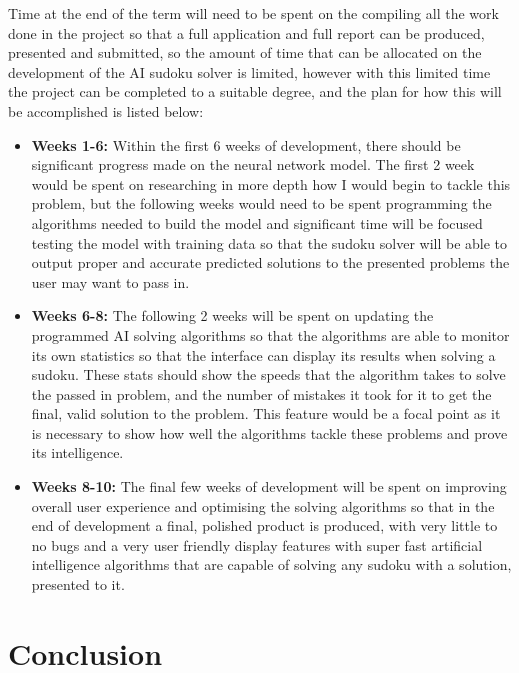\documentclass[]{final_report}
\begin{document}
Time at the end of the term will need to be spent on the compiling all the work done in the project so that a full application and full report can be produced, presented and submitted, so the amount of time that can be allocated on the development of the AI sudoku solver is limited, however with this limited time the project can be completed to a suitable degree, and the plan for how this will be accomplished is listed below:

\begin{itemize} 
    \item \textbf{Weeks 1-6:} Within the first 6 weeks of development, there should be significant progress made on the neural network model. The first 2 week would be spent on researching in more depth how I would begin to tackle this problem, but the following weeks would need to be spent programming the algorithms needed to build the model and significant time will be focused testing the model with training data so that the sudoku solver will be able to output proper and accurate predicted solutions to the presented problems the user may want to pass in.

    \item \textbf{Weeks 6-8:} The following 2 weeks will be spent on updating the programmed AI solving algorithms so that the algorithms are able to monitor its own statistics so that the interface can display its results when solving a sudoku. These stats should show the speeds that the algorithm takes to solve the passed in problem, and the number of mistakes it took for it to get the final, valid solution to the problem. This feature would be a focal point as it is necessary to show how well the algorithms tackle these problems and prove its intelligence. 
    
    \item \textbf{Weeks 8-10:} The final few weeks of development will be spent on improving overall user experience and optimising the solving algorithms so that in the end of development a final, polished product is produced, with very little to no bugs and a very user friendly display features with super fast artificial intelligence algorithms that are capable of solving any sudoku with a solution, presented to it. 
\end{itemize}

\chapter{Conclusion}
\end{document}
